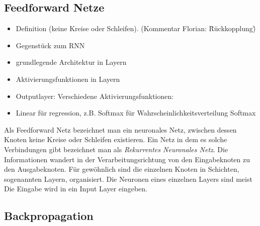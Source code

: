 


\subsection{Feedforward Netze}

\begin{itemize}
	\item Definition (keine Kreise oder Schleifen). (Kommentar Florian: \"Rückkopplung\")
	\item Gegenstück zum RNN
	\item grundlegende Architektur in Layern 
	\item Aktivierungsfunktionen in Layern
	\item Outputlayer: Verschiedene Aktivierungsfunktionen:
	\item Linear für regression, z.B. Softmax für Wahrscheinlichkeitsverteilung Softmax
\end{itemize}



Als Feedforward Netz bezeichnet man ein neuronales Netz, zwischen dessen Knoten keine Kreise oder Schleifen existieren.
Ein Netz in dem es solche Verbindungen gibt bezeichnet man als \textit{Rekurrentes Neuronales Netz}.
Die Informationen wandert in der Verarbeitungsrichtung von den Eingabeknoten zu den Ausgabeknoten.
Für gewöhnlich sind die einzelnen Knoten in Schichten, sogenannten Layern, organisiert.
Die Neuronen eines einzelnen Layers sind meist 
Die Eingabe wird in ein Input Layer eingeben.

\subsection{Backpropagation}


